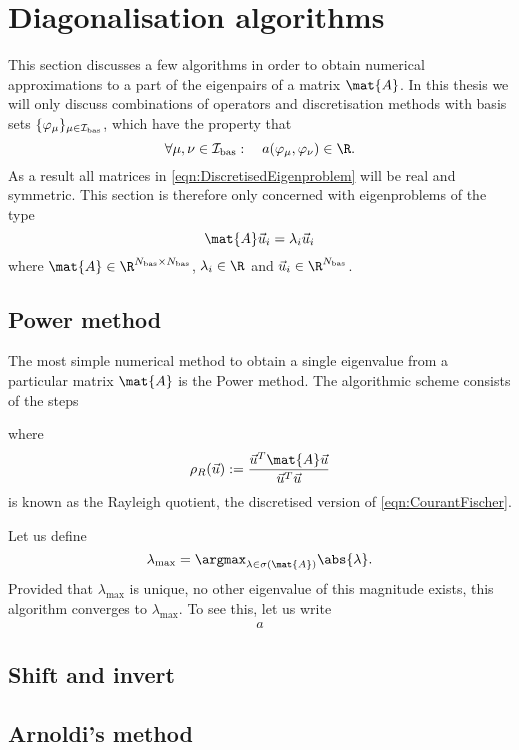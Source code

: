 \section{Diagonalisation algorithms}
\label{sec:DiagAlgos}

This section discusses a few algorithms in order to obtain
numerical approximations to a part of the eigenpairs of a matrix $\mat{A}$.
In this thesis we will only discuss combinations of operators
and discretisation methods with basis sets
$\{\varphi_\mu\}_{\mu \in \mathcal{I}_\text{bas}}$, which have the property that
\[ \forall \mu, \nu \in \Ibas: \quad a(\varphi_\mu, \varphi_\nu) \in \R. \]
As a result all matrices in \eqref{eqn:DiscretisedEigenproblem}
will be real and symmetric.
This section is therefore only concerned with eigenproblems of the type
\[ \mat{A} \vec{u}_i = \lambda_i \vec{u}_i \]
where $\mat{A} \in \R^{\Nbas \times \Nbas}$,
$\lambda_i \in \R$ and $\vec{u}_i \in \R^{\Nbas}$.

\subsection{Power method}
The most simple numerical method to obtain
a single eigenvalue from a particular matrix $\mat{A}$
is the Power method.
The algorithmic scheme consists of the steps


where
\[ \rho_R(\vec{u}) := \frac{\vec{u}^T \mat{A} \vec{u}}{\vec{u}^T \vec{u}} \]
is known as the Rayleigh quotient,
the discretised version of \eqref{eqn:CourantFischer}.

Let us define
\[ \lambda_\text{max} = \argmax_{\lambda \in \sigma(\mat{A})} \abs{\lambda}. \]
Provided that $\lambda_\text{max}$ is unique,
\ie no other eigenvalue of this magnitude exists,
this algorithm converges to $\lambda_\text{max}$.
To see this, let us write
\begin{align}
	a
\end{align}




\subsection{Shift and invert}

\subsection{Arnoldi's method}

